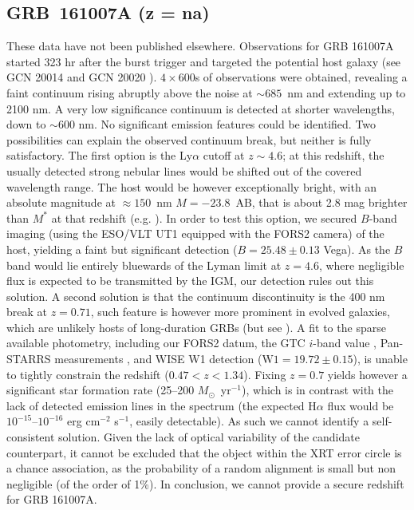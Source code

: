 \documentclass[longauth]{aa}    %
\begin{document}
\subsection{GRB~161007A (z = na)} \label{161007}



These data have not been published elsewhere. Observations for GRB 161007A
started 323 hr after the burst trigger and targeted the potential host galaxy
(see GCN 20014 \citep{GCN20014} and GCN 20020 \citep{GCN20020}). $4 \times 600$s
of observations were obtained, revealing a faint continuum rising abruptly above
the noise at $\sim 685$~nm and extending up to 2100 nm. A very low significance
continuum is detected at shorter wavelengths, down to $\sim  600 $ nm. No
significant emission features could be identified. Two possibilities can explain
the observed continuum break, but neither is fully satisfactory. The first
option is the Ly$\alpha$ cutoff at $z \sim 4.6$; at this redshift, the usually detected
strong nebular lines would be shifted out of the covered wavelength range. The
host would be however exceptionally bright, with an absolute magnitude at
$\approx 150$~nm{} $M = -23.8$~AB, that is about 2.8 mag brighter than $M^*$ at
that redshift (e.g. \citealt{Bouwens2015}). In order to test this option, we
secured $B$-band imaging (using the ESO/VLT UT1 equipped with the FORS2 camera)
of the host, yielding a faint but significant detection ($B = 25.48 \pm 0.13$
Vega). As the $B$ band would lie entirely bluewards of the Lyman limit at $z =
4.6$, where negligible flux is expected to be transmitted by the IGM, our
detection rules out this solution. A second solution is that the continuum
discontinuity is the 400 nm break at $z = 0.71$, such feature is however more
prominent in evolved galaxies, which are unlikely hosts of long-duration GRBs
(but see \citealt{Rossi2014}). A fit to the sparse available photometry,
including our FORS2 datum, the GTC $i$-band value \citep{GCN20014}, Pan-STARRS
measurements \citep{Chambers2016}, and WISE \citep{Wright2010} W1 detection
($\mbox{W1}=19.72\pm0.15$), is unable to tightly constrain the redshift ($0.47 <
z < 1.34$). Fixing $z = 0.7$ yields however a significant star formation rate
(25--200 $M_\odot$~yr$^{-1}$), which is in contrast with the lack of detected
emission lines in the spectrum (the expected H$\alpha$ flux would be
$10^{-15}$--$10^{-16}$ erg cm$^{-2}$ s$^{-1}$, easily detectable). As such we
cannot identify a self-consistent solution. Given the lack of optical
variability of the candidate counterpart, it cannot be excluded that the object
within the XRT error circle is a chance association, as the probability of a
random alignment is small but non negligible (of the order of 1\%). In
conclusion, we cannot provide a secure redshift for GRB 161007A.
\end{document}

